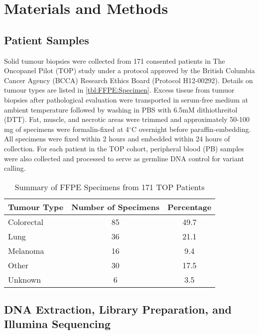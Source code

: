 
\chapter{Materials and Methods}
\label{ch:Materialsandmethods}

\section{Patient Samples}
\label{sec:PatientSamples}

Solid tumour biopsies were collected from 171 consented patients in The Oncopanel Pilot (TOP) study under a protocol approved by the British Columbia Cancer Agency (BCCA) Research Ethics Board (Protocol H12-00292). Details on tumour types are listed in \autoref{tbl:FFPE:Specimen}. Excess tissue from tumuor biopsies after pathological evaluation were transported in serum-free medium at ambient temperature followed by washing in PBS with 6.5mM dithiothreitol (DTT). Fat, muscle, and necrotic areas were trimmed and approximately 50-100 mg of specimens were formalin-fixed at 4$^{\circ}$C overnight before paraffin-embedding. All specimens were fixed within 2 hours and embedded within 24 hours of collection. For each patient in the TOP cohort, peripheral blood (PB) samples were also collected and processed to serve as germline DNA control for variant calling.

\begin{table}[!htb]
    \caption{Summary of FFPE Specimens from 171 TOP Patients}
    \label{tbl:FFPE:Specimen}
    \centering
    \begin{tabular}{ l c c }\toprule
    Tumour Type & Number of Specimens & Percentage \\
    \midrule
    Colorectal & 85 & 49.7 \\
    Lung & 36 & 21.1 \\
    Melanoma & 16 & 9.4 \\
    Other & 30 & 17.5 \\
    Unknown & 6 & 3.5 \\
    \bottomrule
    \end{tabular}
\end{table}

\section{DNA Extraction, Library Preparation, and Illumina Sequencing}
\label{sec:DNAExtraction}

